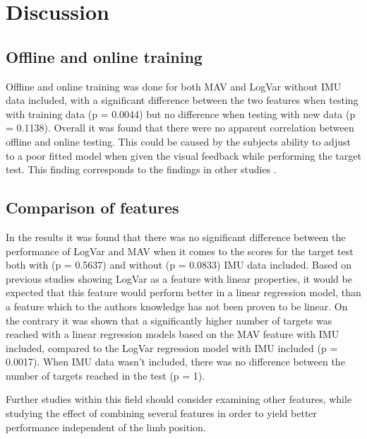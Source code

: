 \section{Discussion}

\subsection{Offline and online training}
Offline and online training was done for both MAV and LogVar without IMU data included, with a significant difference between the two features when testing with training data (p = 0.0044) but no difference when testing with new data (p = 0.1138). Overall it was found that there were no apparent correlation between offline and online testing. This could be caused by the subjects ability to adjust to a poor fitted model when given the visual feedback while performing the target test. This finding corresponds to the findings in other studies \cite{jiang2010}.

\subsection{Comparison of features}
In the results it was found that there was no significant difference between the performance of LogVar and MAV when it comes to the scores for the target test both with (p = 0.5637) and without (p = 0.0833) IMU data included. Based on previous studies showing LogVar as a feature with linear properties, it would be expected that this feature would perform better in a linear regression model, than a feature which to the authors knowledge has not been proven to be linear. On the contrary it was shown that a significantly higher number of targets was reached with a linear regression models based on the MAV feature with IMU included, compared to the LogVar regression model with IMU included (p = 0.0017). When IMU data wasn't included, there was no difference between the number of targets reached in the test (p = 1).

Further studies within this field should consider examining other features, while studying the effect of combining several features in order to yield better performance independent of the limb position.

